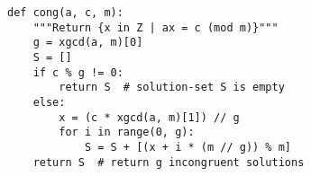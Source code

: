\documentclass[10pt,twoside]{article}
\begin{document}
\begin{enumerate}[itemsep=1em,label=\Alph*.]
\begin{lstlisting}
def cong(a, c, m):
    """Return {x in Z | ax = c (mod m)}"""
    g = xgcd(a, m)[0]
    S = []
    if c % g != 0:
        return S  # solution-set S is empty
    else:
        x = (c * xgcd(a, m)[1]) // g
        for i in range(0, g):
            S = S + [(x + i * (m // g)) % m]
    return S  # return g incongruent solutions
\end{lstlisting}


\end{enumerate}
\end{document}
